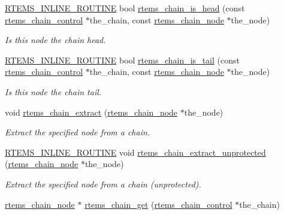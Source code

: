 \begin{DoxyCompactItemize}
\mbox{\hyperlink{group__RTEMSScoreBaseDefs_gac216239df231d5dbd15e3520b0b9313f}{R\+T\+E\+M\+S\+\_\+\+I\+N\+L\+I\+N\+E\+\_\+\+R\+O\+U\+T\+I\+NE}} bool \mbox{\hyperlink{group__ClassicChains_gacdba54d022c1f726e4029aa620bccb4d}{rtems\+\_\+chain\+\_\+is\+\_\+head}} (const \mbox{\hyperlink{unionChain__Control}{rtems\+\_\+chain\+\_\+control}} $\ast$the\+\_\+chain, const \mbox{\hyperlink{structChain__Node__struct}{rtems\+\_\+chain\+\_\+node}} $\ast$the\+\_\+node)
\begin{DoxyCompactList}\small\item\em Is this node the chain head. \end{DoxyCompactList}\item 
\mbox{\hyperlink{group__RTEMSScoreBaseDefs_gac216239df231d5dbd15e3520b0b9313f}{R\+T\+E\+M\+S\+\_\+\+I\+N\+L\+I\+N\+E\+\_\+\+R\+O\+U\+T\+I\+NE}} bool \mbox{\hyperlink{group__ClassicChains_ga0131faa875818fc0cddb4c960e599396}{rtems\+\_\+chain\+\_\+is\+\_\+tail}} (const \mbox{\hyperlink{unionChain__Control}{rtems\+\_\+chain\+\_\+control}} $\ast$the\+\_\+chain, const \mbox{\hyperlink{structChain__Node__struct}{rtems\+\_\+chain\+\_\+node}} $\ast$the\+\_\+node)
\begin{DoxyCompactList}\small\item\em Is this node the chain tail. \end{DoxyCompactList}\item 
void \mbox{\hyperlink{group__ClassicChains_gae1356b67c9bce8d8fbb0b0241afcb3c2}{rtems\+\_\+chain\+\_\+extract}} (\mbox{\hyperlink{structChain__Node__struct}{rtems\+\_\+chain\+\_\+node}} $\ast$the\+\_\+node)
\begin{DoxyCompactList}\small\item\em Extract the specified node from a chain. \end{DoxyCompactList}\item 
\mbox{\hyperlink{group__RTEMSScoreBaseDefs_gac216239df231d5dbd15e3520b0b9313f}{R\+T\+E\+M\+S\+\_\+\+I\+N\+L\+I\+N\+E\+\_\+\+R\+O\+U\+T\+I\+NE}} void \mbox{\hyperlink{group__ClassicChains_gaa8062d288572dd93db348803a5229c12}{rtems\+\_\+chain\+\_\+extract\+\_\+unprotected}} (\mbox{\hyperlink{structChain__Node__struct}{rtems\+\_\+chain\+\_\+node}} $\ast$the\+\_\+node)
\begin{DoxyCompactList}\small\item\em Extract the specified node from a chain (unprotected). \end{DoxyCompactList}\item 
\mbox{\hyperlink{structChain__Node__struct}{rtems\+\_\+chain\+\_\+node}} $\ast$ \mbox{\hyperlink{group__ClassicChains_ga46e031f6b5fddb8e9aedae6e82496bde}{rtems\+\_\+chain\+\_\+get}} (\mbox{\hyperlink{unionChain__Control}{rtems\+\_\+chain\+\_\+control}} $\ast$the\+\_\+chain)

\end{DoxyCompactItemize}
